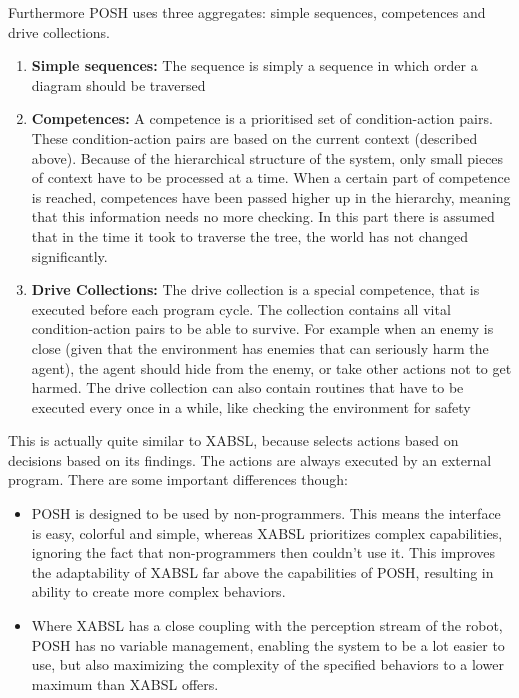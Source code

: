 \documentclass[a4paper,10pt]{article}
\begin{document}
Furthermore POSH uses three aggregates: simple sequences, competences and drive
collections.

\begin{enumerate}
    \item \textbf{Simple sequences:}
        The sequence is simply a sequence in which order a diagram should be
        traversed
    \item \textbf{Competences:}
        A competence is a prioritised set of condition-action pairs. These
        condition-action pairs are based on the current context (described
        above). Because of the hierarchical structure of the system, only small
        pieces of context have to be processed at a time. When a certain part of
        competence is reached, competences have been passed higher up in the
        hierarchy, meaning that this information needs no more checking. In this
        part there is assumed that in the time it took to traverse the tree, the
        world has not changed significantly.
    \item \textbf{Drive Collections:}
        The drive collection is a special competence, that is executed before
        each program cycle. The collection contains all vital condition-action
        pairs to be able to survive. For example when an enemy is close (given
        that the environment has enemies that can seriously harm the agent), the
        agent should hide from the enemy, or take other actions not to get
        harmed. The drive collection can also contain routines that have to be
        executed every once in a while, like checking the environment for safety
\end{enumerate}

This is actually quite similar to XABSL,
because selects actions based on decisions based on its findings. 
The actions are always executed by an external program. There are some important differences though:

\begin{itemize}
    \item POSH is designed to be used by non-pro\-gram\-mers. This means the
    interface is easy, colorful and simple, whereas XABSL prioritizes complex
    capabilities, ignoring the fact that non-programmers then couldn't use it.
    This improves the adaptability of XABSL far above the capabilities of POSH,
    resulting in ability to create more complex behaviors.
    \item Where XABSL has a close coupling with the perception stream of the
    robot, POSH has no variable management, enabling the system to be a lot
    easier to use, but also maximizing the complexity of the specified behaviors
    to a lower maximum than XABSL offers.
\end{itemize}
\end{document}
